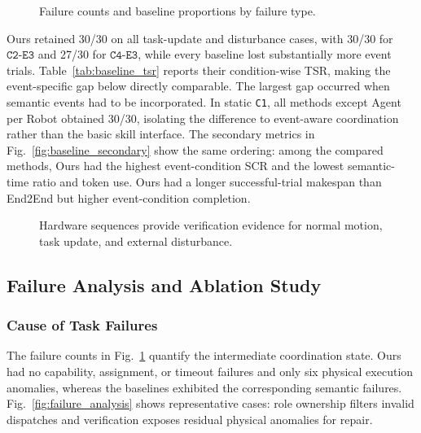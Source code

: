 \begin{figure}[!t]
  \centering
  
  \vspace{-0.1in}
  \caption{Failure counts and baseline proportions by failure type.}
  \label{fig:failure_distribution}
\end{figure}


Ours retained 30/30 on all task-update
and disturbance cases, with 30/30 for $\texttt{C2-E3}$ and 27/30 for
$\texttt{C4-E3}$, while every baseline
lost substantially more event trials.
Table~\ref{tab:baseline_tsr} reports their
condition-wise TSR, making the event-specific gap below directly comparable.
The largest gap occurred when semantic events had to be incorporated.
In static \texttt{C1}, all methods except
Agent per Robot obtained 30/30, isolating the difference to event-aware
coordination rather than the basic skill interface.
The secondary metrics in Fig.~\ref{fig:baseline_secondary} show the same
ordering: among the compared methods, Ours had the highest event-condition SCR
and the lowest semantic-time ratio and token use. Ours had a longer
successful-trial makespan than End2End but higher event-condition completion.


\begin{figure}[!t]
  \centering
  
  \vspace{-0.1in}
  \caption{Hardware sequences provide verification evidence for normal motion,
  task update, and external disturbance.}
  \label{fig:hardware_experiments}
\end{figure}

\subsection{Failure Analysis and Ablation Study}
\label{sec:failure_analysis}
\label{sec:ablation}

\subsubsection{Cause of Task Failures}


The failure counts in Fig.~\ref{fig:failure_distribution} quantify the
intermediate coordination state. Ours had no capability, assignment, or timeout
failures and only six physical execution anomalies, whereas the baselines
exhibited the corresponding semantic failures. Fig.~\ref{fig:failure_analysis}
shows representative cases: role ownership filters invalid dispatches and
verification exposes residual physical anomalies for repair.

